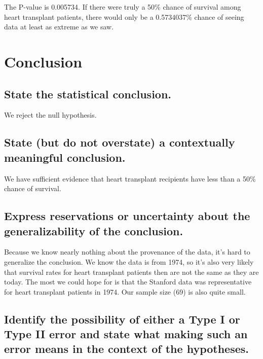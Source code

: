 \documentclass[
]{book}
\begin{document}
The P-value is 0.005734. If there were truly a 50\% chance of survival among heart transplant patients, there would only be a 0.5734037\% chance of seeing data at least as extreme as we saw.

\hypertarget{one-prop-ex-ht-conclusion}{%
\section{Conclusion}\label{one-prop-ex-ht-conclusion}}

\hypertarget{one-prop-ex-stat-conclusion}{%
\subsection{State the statistical conclusion.}\label{one-prop-ex-stat-conclusion}}

We reject the null hypothesis.

\hypertarget{one-prop-ex-context-conclusion}{%
\subsection{State (but do not overstate) a contextually meaningful conclusion.}\label{one-prop-ex-context-conclusion}}

We have sufficient evidence that heart transplant recipients have less than a 50\% chance of survival.

\hypertarget{one-prop-ex-reservations}{%
\subsection{Express reservations or uncertainty about the generalizability of the conclusion.}\label{one-prop-ex-reservations}}

Because we know nearly nothing about the provenance of the data, it's hard to generalize the conclusion. We know the data is from 1974, so it's also very likely that survival rates for heart transplant patients then are not the same as they are today. The most we could hope for is that the Stanford data was representative for heart transplant patients in 1974. Our sample size (69) is also quite small.

\hypertarget{one-prop-ex-errors}{%
\subsection{Identify the possibility of either a Type I or Type II error and state what making such an error means in the context of the hypotheses.}\label{one-prop-ex-errors}}
\end{document}
